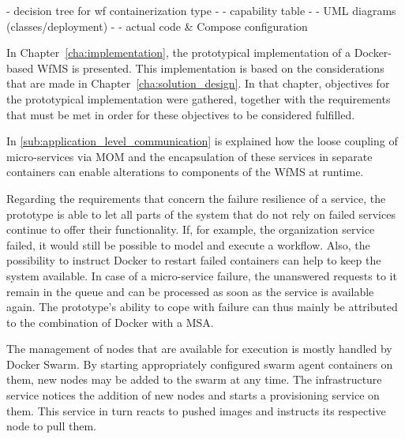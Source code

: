 
  - decision tree for wf containerization type -
  - capability table -
  - UML diagrams (classes/deployment) -
  - actual code \& Compose configuration


  In Chapter~\ref{cha:implementation}, the prototypical implementation of a Docker-based \ac{WfMS} is presented. This implementation is based on the considerations that are made in Chapter~\ref{cha:solution_design}. In that chapter, objectives for the prototypical implementation were gathered, together with the requirements that must be met in order for these objectives to be considered fulfilled.


  In \ref{sub:application_level_communication} is explained how the loose coupling of micro-services via \ac{MOM} and the encapsulation of these services in separate containers can enable alterations to components of the \ac{WfMS} at runtime.

  Regarding the requirements that concern the failure resilience of a service, the prototype is able to let all parts of the system that do not rely on failed services continue to offer their functionality. If, for example, the organization service failed, it would still be possible to model and execute a workflow. Also, the possibility to instruct Docker to restart failed containers can help to keep the system available. In case of a micro-service failure, the unanswered requests to it remain in the queue and can be processed as soon as the service is available again. The prototype's ability to cope with failure can thus mainly be attributed to the combination of Docker with a \ac{MSA}.

  The management of nodes that are available for execution is mostly handled by Docker Swarm. By starting appropriately configured swarm agent containers on them, new nodes may be added to the swarm at any time. The infrastructure service notices the addition of new nodes and starts a provisioning service on them. This service in turn reacts to pushed images and instructs its respective node to pull them.

